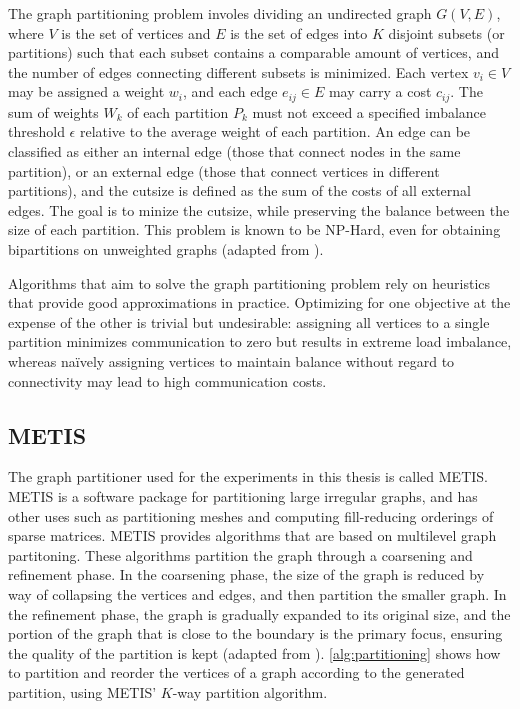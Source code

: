 The graph partitioning problem involes dividing an undirected graph \(G(V,E)\), where \(V\) is the set of vertices and \(E\) is the set of edges into \(K\) disjoint subsets (or partitions) such that each subset contains a comparable amount of vertices, and the number of edges connecting different subsets is minimized. Each vertex \(v_{i} \in V\) may be assigned a weight \(w_{i}\), and each edge \(e_{ij} \in E\) may carry a cost \(c_{ij}\). The sum of weights \(W_{k}\) of each partition \(P_{k}\) must not exceed a specified imbalance threshold \(\epsilon\) relative to the average weight of each partition. An edge can be classified as either an internal edge (those that connect nodes in the same partition), or an external edge (those that connect vertices in different partitions), and the cutsize is defined as the sum of the costs of all external edges. The goal is to minize the cutsize, while preserving the balance between the size of each partition. This problem is known to be NP-Hard, even for obtaining bipartitions on unweighted graphs (adapted from \cite{hypergraphpartitioning}).
\medskip

Algorithms that aim to solve the graph partitioning problem rely on heuristics that provide good approximations in practice. Optimizing for one objective at the expense of the other is trivial but undesirable: assigning all vertices to a single partition minimizes communication to zero but results in extreme load imbalance, whereas naïvely assigning vertices to maintain balance without regard to connectivity may lead to high communication costs.

\subsection{METIS}
The graph partitioner used for the experiments in this thesis is called METIS. METIS is a software package for partitioning large irregular graphs, and has other uses such as partitioning meshes and computing fill-reducing orderings of sparse matrices. METIS provides algorithms that are based on multilevel graph partitoning. These algorithms partition the graph through a coarsening and refinement phase. In the coarsening phase, the size of the graph is reduced by way of collapsing the vertices and edges, and then partition the smaller graph. In the refinement phase, the graph is gradually expanded to its original size, and the portion of the graph that is close to the boundary is the primary focus, ensuring the quality of the partition is kept (adapted from \cite{karypis1997metis}). \autoref{alg:partitioning} shows how to partition and reorder the vertices of a graph according to the generated partition, using METIS' \(K\)-way partition algorithm.
\medskip

